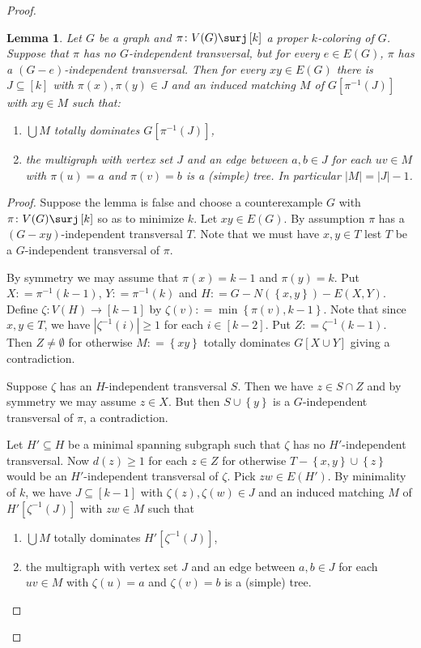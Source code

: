 \documentclass{amsbook}
\theoremstyle{plain}
\newtheorem{lemma}{Lemma}
\numberwithin{equation}{chapter}
\newcommand{\set}[1]{\left\{ #1 \right\}}
\newcommand{\card}[1]{\left|#1\right|}
\newcommand{\func}[3]{#1\colon #2 \rightarrow #3}
\newcommand{\funcsurj}[3]{#1\colon #2 \surj #3}
\newcommand{\irange}[1]{\left[#1\right]}
\newcommand{\brackets}[1]{\left[ #1 \right]}
\newcommand{\DefinedAs}{\mathrel{\mathop:}=}
\begin{document}
\begin{proof}
\begin{lemma}\label{BaseTransversalLemma}
Let $G$ be a graph and $\funcsurj{\pi}{V(G)}{\irange{k}}$ a proper $k$-coloring of
$G$.  Suppose that $\pi$ has no $G$-independent transversal, but for every $e
\in E(G)$, $\pi$ has a $(G-e)$-independent transversal. Then for every $xy \in
E(G)$ there is $J \subseteq \irange{k}$ with $\pi(x), \pi(y) \in J$ and an 
induced matching $M$ of $G\brackets{\pi^{-1}(J)}$ with $xy \in M$ such that:
\begin{enumerate}
  \item $\bigcup M$ totally dominates $G\brackets{\pi^{-1}(J)}$,
  \item the multigraph with vertex set $J$ and an edge between $a, b \in J$ for
  each $uv \in M$ with $\pi(u) = a$ and $\pi(v) = b$ is a (simple) tree.  In
  particular $\card{M} = \card{J} - 1$.
\end{enumerate}
\end{lemma}
\begin{proof}
Suppose the lemma is false and choose a counterexample $G$ with
$\funcsurj{\pi}{V(G)}{\irange{k}}$ so as to minimize $k$.  Let $xy \in E(G)$.
By assumption $\pi$ has a $(G-xy)$-independent transversal $T$.  Note that we
must have $x,y \in T$ lest $T$ be a $G$-independent transversal of $\pi$.

By symmetry we may assume that $\pi(x) = k-1$ and $\pi(y) = k$. Put $X
\DefinedAs \pi^{-1}(k-1)$, $Y \DefinedAs \pi^{-1}(k)$ and $H \DefinedAs G -
N(\set{x, y}) - E(X,Y)$. Define $\func{\zeta}{V(H)}{\irange{k-1}}$ by $\zeta(v)
\DefinedAs \min\set{\pi(v), k-1}$. Note that since $x,y \in T$, we have
$\card{\zeta^{-1}(i)} \geq 1$ for each $i \in \irange{k-2}$.  Put $Z \DefinedAs
\zeta^{-1}(k-1)$. Then $Z \neq \emptyset$ for otherwise $M \DefinedAs \set{xy}$
totally dominates $G[X \cup Y]$ giving a contradiction.

Suppose $\zeta$ has an $H$-independent transversal $S$.  Then we have $z \in S
\cap Z$ and by symmetry we may assume $z \in X$.  But then $S \cup \set{y}$ is
a $G$-independent transversal of $\pi$, a contradiction.

Let $H' \subseteq H$ be a minimal spanning subgraph such that $\zeta$ has no
$H'$-independent transversal.  Now $d(z) \geq 1$ for each $z \in Z$ for
otherwise $T - \set{x,y} \cup \set{z}$ would be an $H'$-independent transversal
of $\zeta$.  Pick $zw \in E(H')$.  By minimality of $k$, we have $J \subseteq
\irange{k-1}$ with $\zeta(z), \zeta(w) \in J$ and an induced matching $M$ of
$H'\brackets{\zeta^{-1}(J)}$ with $zw \in M$ such that
\begin{enumerate}
  \item $\bigcup M$ totally dominates $H'\brackets{\zeta^{-1}(J)}$,
  \item the multigraph with vertex set $J$ and an edge between $a, b \in J$ for
  each $uv \in M$ with $\zeta(u) = a$ and $\zeta(v) = b$ is a (simple) tree.
\end{enumerate}


\end{proof}
\end{proof}
\end{document}
